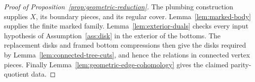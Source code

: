 \begin{proof}[Proof of Proposition~\ref{prop:geometric-reduction}]
The plumbing construction supplies \(X\), its boundary pieces, and its
regular cover. Lemma~\ref{lem:marked-body} supplies the finite marked
family. Lemma~\ref{lem:exterior-duals} checks every input hypothesis of
Assumption~\ref{ass:disk} in the exterior of the bottoms.
The replacement disks and framed bottom compressions then give the
disks required by Lemma~\ref{lem:connected-tree-cuts}, and hence the
relations in connected vertex pieces. Finally
Lemma~\ref{lem:geometric-edge-cohomology} gives the claimed parity-quotient data.
\end{proof}
